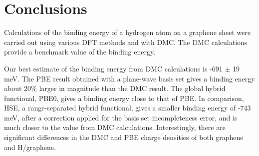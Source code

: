
\section{Conclusions}
Calculations of the binding energy of a hydrogen atom on a graphene sheet were carried out using various DFT methods and with DMC.
The DMC calculations provide a benchmark value of the binding energy.

Our best estimate of the binding energy from DMC calculations is -691 $\pm$ 19 meV.
The PBE result obtained with a plane-wave basis set gives a binding energy about 20\% larger in magnitude than the DMC result.
The global hybrid functional, PBE0, gives a binding energy close to that of PBE.
In comparison, HSE, a range-separated hybrid functional, gives a smaller binding energy of -743 meV, after a correction applied for the basis set incompleteness error, and is much closer to the value from DMC calculations.
Interestingly, there are significant differences in the DMC and PBE charge densities of both graphene and H/graphene.
